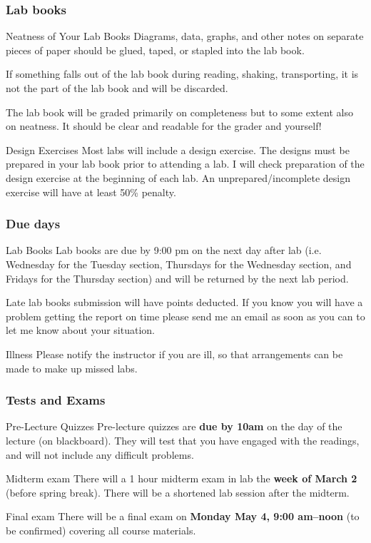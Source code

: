 \documentclass[beamer]{standalone}
\begin{document}
\begin{frame}
\frametitle{Lab books}

\begin{block}{Neatness of Your Lab Books}
Diagrams, data, graphs, and other notes on separate pieces of paper should be
glued, taped, or stapled into the lab book.

\alert{If something falls out of the lab book during reading, shaking, transporting,
it is not the part of the lab book and will be discarded.}

The lab book will be graded primarily on completeness but to some extent also on neatness.
It should be clear and readable for the grader and yourself!
\end{block}

\begin{block}{Design Exercises}
Most labs will include a design exercise.
\alert{The designs must be prepared in your lab book prior to attending a lab}.
I will check preparation of the design exercise at the beginning of each lab.
\alert{An unprepared/incomplete design exercise will have at least 50\% penalty.}
\end{block}
\end{frame}


\begin{frame}
\frametitle{Due days}
\begin{block}{Lab Books}
Lab books are due by 9:00 pm on the next day after lab (i.e. Wednesday for the Tuesday section, Thursdays for the Wednesday section, and Fridays for the Thursday section) and will be returned by the next lab period.

Late lab books submission will have  points deducted. If you  know you will have a problem getting  the report on time please send me  an email as soon as you can to let me know about your situation.
\end{block}

\begin{block}{Illness}
Please notify the instructor if you are ill, so that arrangements can be made to make up missed labs.
\end{block}
\end{frame}


\begin{frame}
\frametitle{Tests and Exams}
\begin{block}{Pre-Lecture Quizzes}
Pre-lecture quizzes are \textbf{due by 10am} on the day of the lecture (on blackboard).  They will test that you have engaged with the readings, and will not include any difficult problems.
\end{block}

\begin{block}{Midterm exam}
There will a 1 hour midterm exam in lab the \textbf{week of March 2} (before spring break). There will be a shortened lab session after the midterm.
\end{block}

\begin{block}{Final exam}
There will be a final exam on \textbf{Monday May 4, 9:00 am--noon} (to be confirmed) covering all course materials.
\end{block}
\end{frame}
\end{document}
